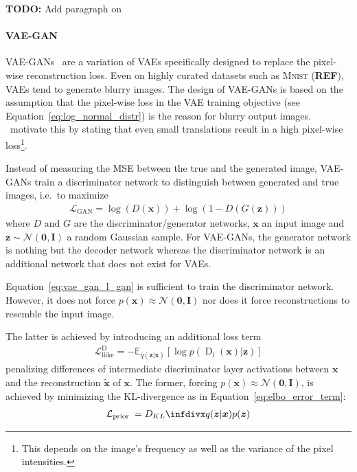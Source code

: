 \textbf{TODO:}
Add paragraph on \citet{burgess2018understanding}

\paragraph{\ac{VAE}-\ac{GAN}}
\ac{VAE}-\acp{GAN}~\citep{larsen2015autoencoding} are a variation of \acp{VAE} specifically designed to replace the pixel-wise reconstruction loss.
Even on highly curated datasets such as \textsc{Mnist} (\textbf{REF}), \acp{VAE} tend to generate blurry images.
The design of \ac{VAE}-\acp{GAN} is based on the assumption that the pixel-wise loss in the \ac{VAE} training objective (see Equation~\ref{eq:log_normal_distr}) is the reason for blurry output images.
\citet{larsen2015autoencoding}~motivate this by stating that even small translations result in a high pixel-wise loss\footnote{This depends on the image's frequency as well as the variance of the pixel intensities.}.

Instead of measuring the \ac{MSE} between the true and the generated image, \ac{VAE}-\acp{GAN} train a discriminator network to distinguish between generated and true images, i.e.~to maximize
\begin{align}
    \mathcal{L}_{\mathrm{GAN}}=\log (D(\bm{x}))+\log (1-D(G(\bm{z}))) \label{eq:vae_gan_l_gan}
\end{align}
where $D$ and $G$ are the discriminator/generator networks, $\bm{x}$ an input image and $\bm{z}\sim \mathcal{N}(\bm{0},\bm{I})$ a random Gaussian sample.
For \ac{VAE}-\acp{GAN}, the generator network is nothing but the decoder network whereas the discriminator network is an additional network that does not exist for \acp{VAE}.

Equation~\ref{eq:vae_gan_l_gan} is sufficient to train the discriminator network.
However, it does not force $p(\bm{x}) \approx \mathcal{N}(\bm{0},\bm{I})$ nor does it force reconstructions to resemble the input image.

The latter is achieved by introducing an additional loss term
\begin{align}
    \mathcal{L}_{\text {llike}}^{\text {D}}=-\mathbb{E}_{q(\bm{z} | \bm{x})}\left[\log p\left(\operatorname{D}_{l}(\bm{x}) | \bm{z}\right)\right]
\end{align}
penalizing differences of intermediate discriminator layer activations between $\bm{x}$ and the reconstruction $\tilde{\bm{x}}$ of $\bm{x}$.
The former, forcing $p(\bm{x}) \approx \mathcal{N}(\bm{0},\bm{I})$, is achieved by minimizing the \ac{KL}-divergence as in Equation~\ref{eq:elbo_error_term}:
\begin{align}
    \mathcal{L}_{\text {prior }}=\kldiv{q(\boldsymbol{z} | \boldsymbol{x})}{p(\boldsymbol{z})}
\end{align}

